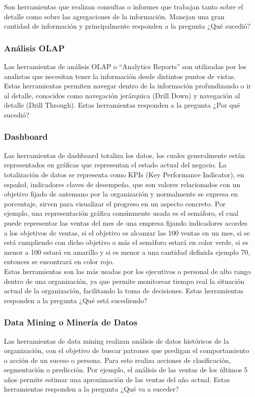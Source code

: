 Son herramientas que realizan consultas o informes que trabajan tanto sobre el detalle como sobre las agregaciones de la información. Manejan una gran cantidad de información y principalmente responden a la pregunta ¿Qué sucedió?

\subsubsection{Análisis OLAP}

Las herramientas de análisis OLAP o ``Analytics Reports'' son utilizadas por los analistas que necesitan tener la información desde distintos puntos de vistas. Estas herramientas permiten navegar dentro de la información profundizando o ir al detalle, conocidos como navegación jerárquica (Drill Down) y navegación al detalle (Drill Through). Estas herramientas responden a la pregunta ¿Por qué sucedió?

\subsubsection{Dashboard}

Las herramientas de dashboard totaliza los datos, los cuales generalmente están representados en gráficas que representan el estado actual del negocio. La totalización de datos se representa como KPIs (Key Performance Indicator), en español, indicadores claves de desempeño, que son valores relacionados con un objetivo fijado de antemano por la organización y normalmente se expresa en porcentaje, sirven para visualizar el progreso en un aspecto concreto. Por ejemplo, una representación gráfica comúnmente usada es el semáforo, el cual puede representar las ventas del mes de una empresa fijando indicadores acordes a los objetivos de ventas, si el objetivo es alcanzar las 100 ventas en un mes, si se está cumpliendo con dicho objetivo o más el semáforo estará en color verde, si es menor a 100 estará en amarillo y si es menor a una cantidad definida ejemplo 70, entonces se encontrará en color rojo.\\

Estas herramientas son las más usadas por los ejecutivos o personal de alto rango dentro de una organización, ya que permite monitorear tiempo real la situación actual de la organización, facilitando la toma de decisiones. Estas herramientas responden a la pregunta ¿Qué está sucediendo?


\subsubsection{Data Mining o Minería de Datos}

Las herramientas de data mining realizan análisis de datos históricos de la organización, con el objetivo de buscar patrones que predigan el comportamiento o acción de un suceso o persona. Para esto realiza acciones de clasificación, segmentación o predicción. Por ejemplo, el análisis de las ventas de los últimos 5 años permite estimar una aproximación de las ventas del año actual. Estas herramientas responden a la pregunta ¿Qué va a suceder?





